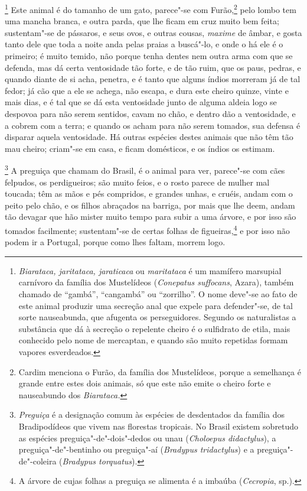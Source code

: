 \begin{linenumbers}
\footnote{ \textit{Biarataca, jaritataca,
jaraticaca} ou \textit{maritataca} é um mamífero marsupial carnívoro
da família dos Mustelídeos (\textit{Conepatus suffocans}, Azara),
também chamado de ``gambá'', ``cangambá'' ou ``zorrilho''. O nome deve"-se ao
fato de este animal produzir uma secreção anal que expele para
defender"-se, de tal sorte nauseabunda, que afugenta os perseguidores.
Segundo os naturalistas a substância que dá à secreção o repelente
cheiro é o sulfidrato de etila, mais conhecido pelo nome de mercaptan,
e quando são muito repetidas formam vapores esverdeados.} Este animal é 
do tamanho de um gato, parece"-se com Furão,\footnote{ Cardim menciona o 
Furão, da família dos Mustelídeos, porque a
semelhança é grande entre estes dois animais, só que este não emite o
cheiro forte e nauseabundo dos \textit{Biarataca.}} pelo lombo tem uma
mancha branca, e outra parda, que lhe ficam em cruz muito bem feita;
sustentam"-se de pássaros, e seus ovos, e outras cousas, \textit{maxime}
de âmbar, e gosta tanto dele que toda a noite anda pelas praias a
buscá"-lo, e onde o há ele é o primeiro; é muito temido, não
porque tenha dentes nem outra arma com que se defenda, mas dá certa
ventosidade tão forte, e de tão ruim, que os paus, pedras, e quando
diante de si acha, penetra, e é tanto que alguns índios morreram já de
tal fedor; já cão que a ele se achega, não escapa, e dura este cheiro
quinze, vinte e mais dias, e é tal que se dá esta ventosidade junto de
alguma aldeia logo se despovoa para não serem sentidos, cavam no chão,
e dentro dão a ventosidade, e a cobrem com a terra; e quando os acham
para não serem tomados, sua defensa é disparar aquela ventosidade.
 Há outras espécies destes animais que não têm tão mau cheiro; criam"-se
em casa, e ficam domésticos, e os índios os estimam.

\footnote{ \textit{Preguiça} é a designação
comum às espécies de desdentados da família dos Bradipodídeos que vivem
nas florestas tropicais. No Brasil existem sobretudo as espécies
preguiça"-de"-dois"-dedos ou unau (\textit{Choloepus didactylus}), a
preguiça"-de"-bentinho ou preguiça"-aí (\textit{Bradypus tridactylus}) e a
preguiça"-de"-coleira (\textit{Bradypus torquatus}).} A
preguiça que chamam do Brasil, é o animal para ver, parece"-se com cães
felpudos, os perdigueiros; são muito feios, e o rosto parece de mulher
mal toucada; têm as mãos e pés compridos, e grandes unhas, e cruéis,
andam com o peito pelo chão, e os filhos abraçados na barriga, por mais
que lhe deem, andam tão devagar que hão mister muito tempo para subir a
uma árvore, e por isso são tomados facilmente; sustentam"-se de certas
folhas de figueiras,\footnote{ A árvore de cujas folhas a preguiça
se alimenta é a imbaúba (\textit{Cecropia}, sp.).} e por isso não
podem ir a Portugal, porque como lhes faltam, morrem logo.


\end{linenumbers}
